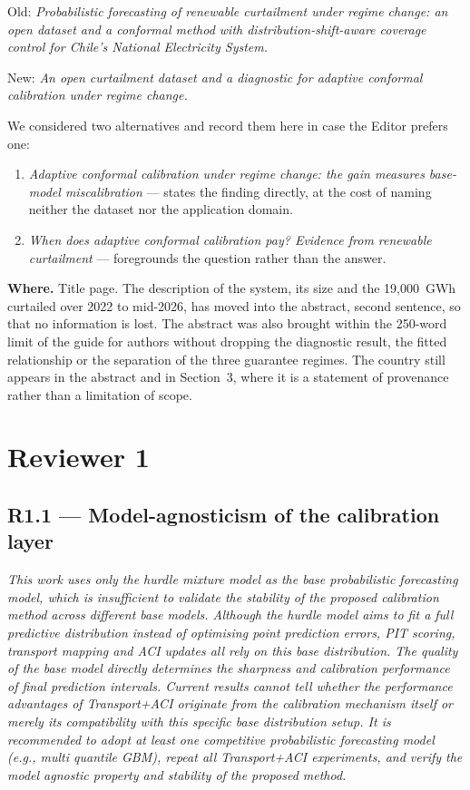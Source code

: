 \documentclass[11pt,a4paper]{article}
\newenvironment{revcomment}
  {\begin{mdframed}[backgroundcolor=quotebg,linecolor=quoterule,linewidth=0.4pt,
    innertopmargin=6pt,innerbottommargin=6pt,skipabove=8pt,skipbelow=8pt]\itshape}
  {\end{mdframed}}
\newcommand{\where}[1]{\textbf{Where.} #1}
\begin{document}
Old: \emph{Probabilistic forecasting of renewable curtailment under regime change: an open dataset and a conformal method with distribution-shift-aware coverage control for Chile's National Electricity System.}

New: \emph{An open curtailment dataset and a diagnostic for adaptive conformal calibration under regime change.}

We considered two alternatives and record them here in case the Editor prefers one:

\begin{enumerate}[leftmargin=1.6em,itemsep=2pt]
\item \emph{Adaptive conformal calibration under regime change: the gain measures base-model miscalibration} --- states the finding directly, at the cost of naming neither the dataset nor the application domain.
\item \emph{When does adaptive conformal calibration pay? Evidence from renewable curtailment} --- foregrounds the question rather than the answer.
\end{enumerate}

\where{Title page. The description of the system, its size and the 19{,}000~GWh curtailed over 2022 to mid-2026, has moved into the abstract, second sentence, so that no information is lost. The abstract was also brought within the 250-word limit of the guide for authors without dropping the diagnostic result, the fitted relationship or the separation of the three guarantee regimes. The country still appears in the abstract and in Section~3, where it is a statement of provenance rather than a limitation of scope.}

\clearpage
\section{Reviewer 1}

\subsection*{R1.1 --- Model-agnosticism of the calibration layer}

\begin{revcomment}
This work uses only the hurdle mixture model as the base probabilistic forecasting model, which is insufficient to validate the stability of the proposed calibration method across different base models. Although the hurdle model aims to fit a full predictive distribution instead of optimising point prediction errors, PIT scoring, transport mapping and ACI updates all rely on this base distribution. The quality of the base model directly determines the sharpness and calibration performance of final prediction intervals. Current results cannot tell whether the performance advantages of Transport+ACI originate from the calibration mechanism itself or merely its compatibility with this specific base distribution setup. It is recommended to adopt at least one competitive probabilistic forecasting model (e.g., multi quantile GBM), repeat all Transport+ACI experiments, and verify the model agnostic property and stability of the proposed method.
\end{revcomment}
\end{document}
